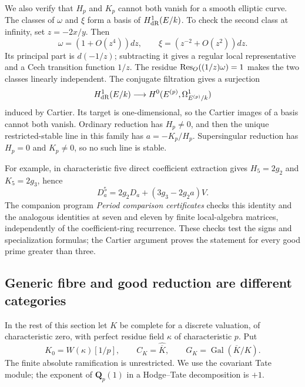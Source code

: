 \documentclass[11pt]{article}
\theoremstyle{definition}\newtheorem{definition}[theorem]{Definition}
\theoremstyle{remark}\newtheorem{remark}[theorem]{Remark}
\newcommand{\Q}{\mathbf Q}\newcommand{\Z}{\mathbf Z}
\DeclareMathOperator{\Gal}{Gal}\DeclareMathOperator{\im}{im}
\begin{document}
We also verify that $H_p$ and $K_p$ cannot both vanish for a smooth elliptic curve. The classes of $\omega$ and $\xi$ form a basis of $H^1_{\mathrm{dR}}(E/k)$. To check the second class at infinity, set $z=-2x/y$. Then
\[
 \omega=(1+O(z^4))dz,\qquad
 \xi=(z^{-2}+O(z^2))dz.
\]
Its principal part is $d(-1/z)$; subtracting it gives a regular local representative and a Cech transition function $1/z$. The residue $\operatorname{Res}_O((1/z)\omega)=1$ makes the two classes linearly independent. The conjugate filtration gives a surjection
\[
 H^1_{\mathrm{dR}}(E/k)\longrightarrow H^0(E^{(p)},\Omega^1_{E^{(p)}/k})
\]
induced by Cartier. Its target is one-dimensional, so the Cartier images of a basis cannot both vanish. Ordinary reduction has $H_p\ne0$, and then the unique restricted-stable line in this family has $a=-K_p/H_p$. Supersingular reduction has $H_p=0$ and $K_p\ne0$, so no such line is stable.

For example, in characteristic five direct coefficient extraction gives $H_5=2g_2$ and $K_5=2g_3$, hence
\[
                 D_a^5=2g_2D_a+(3g_3-2g_2a)V.
\]
The companion program \emph{Period comparison certificates} checks this identity and the analogous identities at seven and eleven by finite local-algebra matrices, independently of the coefficient-ring recurrence. These checks test the signs and specialization formulas; the Cartier argument proves the statement for every good prime greater than three.

\subsection{Generic fibre and good reduction are different categories}
In the rest of this section let $K$ be complete for a discrete valuation, of characteristic zero, with perfect residue field $\kappa$ of characteristic $p$. Put
\[
 K_0=W(\kappa)[1/p],\qquad C_K=\widehat{\overline K},\qquad
 G_K=\Gal(\overline K/K).
\]
The finite absolute ramification is unrestricted. We use the covariant Tate module; the exponent of $\Q_p(1)$ in a Hodge--Tate decomposition is $+1$.
\end{document}
